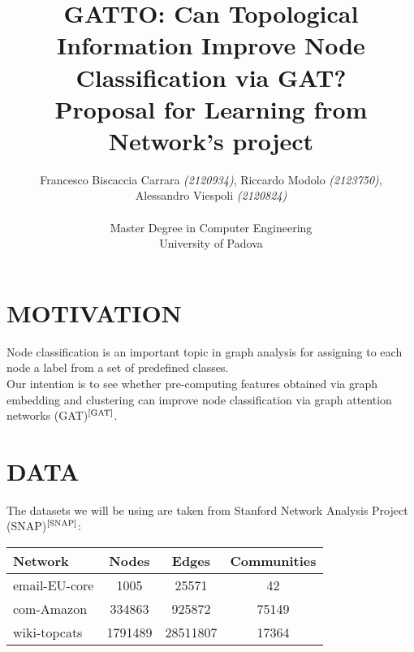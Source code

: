 \documentclass[12pt,conference]{ieeeconf} %
\title{GATTO: Can Topological Information Improve Node Classification via GAT?\\
\large Proposal for Learning from Network's project \\}
\author{Francesco Biscaccia Carrara \textit{(2120934)}, Riccardo Modolo \textit{(2123750)},\\ Alessandro Viespoli \textit{(2120824)} %
\\\\ Master Degree in Computer Engineering \\
University of Padova \\
}
\begin{document}
\maketitle
\thispagestyle{plain}
\pagestyle{plain}

\section{MOTIVATION} 
Node classification is an important topic in graph analysis for assigning to each node a label from a set of predefined classes. \\
Our intention is to see whether pre-computing features obtained via graph embedding and clustering can improve node classification via graph attention networks (GAT)$^\text{\cite{GAT}}$. 

\section{DATA}
The datasets we will be using are taken from Stanford Network Analysis Project (SNAP)$^\text{\cite{SNAP}}$: 
\begin{table}[h!]
\centering
\renewcommand{\arraystretch}{1.5}
\begin{tabular}{|l|c|c|c|}
\hline
\textbf{Network}           & \textbf{Nodes} & \textbf{Edges} & \textbf{Communities} \\
\hline
email-EU-core  & 1005           & 25571          & 42         \\
com-Amazon     & 334863         & 925872         & 75149    \\
wiki-topcats        & 1791489        & 28511807       & 17364    \\
\hline
\end{tabular}
\end{table}
\end{document}
